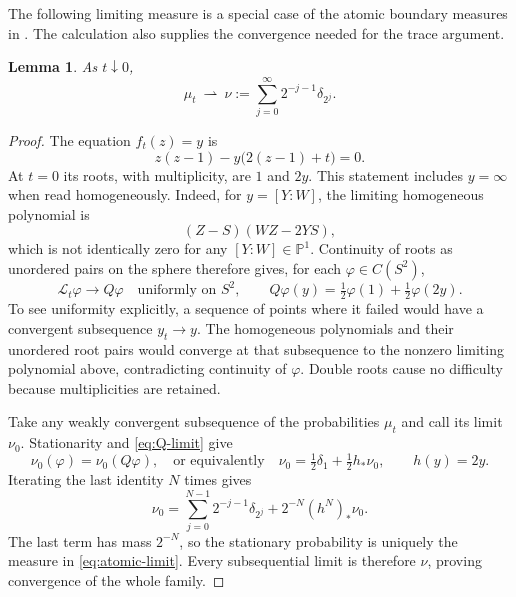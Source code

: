 \documentclass[11pt,reqno]{amsart}
\theoremstyle{plain}
\newtheorem{lemma}[theorem]{Lemma}
\theoremstyle{definition}
\theoremstyle{remark}
\newcommand{\Lop}{\mathcal L}
\numberwithin{equation}{section}
\begin{document}
The following limiting measure is a special case of the atomic boundary measures in \cite{DeM05}. The calculation also supplies the convergence needed for the trace argument.

\begin{lemma}\label{lem:atomic-limit}
As $t\downarrow0$,
\begin{equation}\label{eq:atomic-limit}
 \mu_t\ \rightharpoonup\
 \nu:=\sum_{j=0}^{\infty}2^{-j-1}\delta_{2^j}.
\end{equation}
\end{lemma}

\begin{proof}
The equation $f_t(z)=y$ is
\[
 z(z-1)-y\big(2(z-1)+t\big)=0.
\]
At $t=0$ its roots, with multiplicity, are $1$ and $2y$. This statement includes $y=\infty$ when read homogeneously. Indeed, for $y=[Y:W]$, the limiting homogeneous polynomial is
\[
 (Z-S)(WZ-2YS),
\]
which is not identically zero for any $[Y:W]\in\mathbb P^1$. Continuity of roots as unordered pairs on the sphere therefore gives, for each $\varphi\in C(S^2)$,
\begin{equation}\label{eq:Q-limit}
 \Lop_t\varphi\longrightarrow Q\varphi
 \quad\text{uniformly on }S^2,
 \qquad Q\varphi(y)=\tfrac12\varphi(1)+\tfrac12\varphi(2y).
\end{equation}
To see uniformity explicitly, a sequence of points where it failed would have a convergent subsequence $y_t\to y$. The homogeneous polynomials and their unordered root pairs would converge at that subsequence to the nonzero limiting polynomial above, contradicting continuity of $\varphi$. Double roots cause no difficulty because multiplicities are retained.

Take any weakly convergent subsequence of the probabilities $\mu_t$ and call its limit $\nu_0$. Stationarity and \eqref{eq:Q-limit} give
\[
 \nu_0(\varphi)=\nu_0(Q\varphi),
 \quad\text{or equivalently}\quad
 \nu_0=\tfrac12\delta_1+\tfrac12h_*\nu_0,
 \qquad h(y)=2y.
\]
Iterating the last identity $N$ times gives
\[
 \nu_0=\sum_{j=0}^{N-1}2^{-j-1}\delta_{2^j}
       +2^{-N}(h^N)_*\nu_0.
\]
The last term has mass $2^{-N}$, so the stationary probability is uniquely the measure in \eqref{eq:atomic-limit}. Every subsequential limit is therefore $\nu$, proving convergence of the whole family.
\end{proof}
\end{document}
